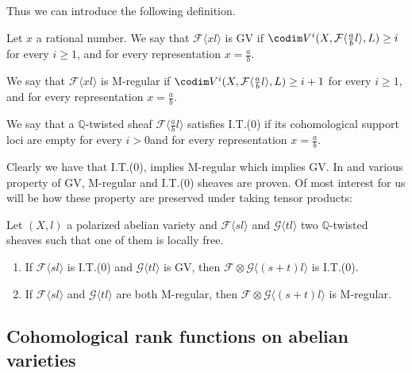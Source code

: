 \documentclass[11pt,letter]{amsart}
\numberwithin{equation}{section}
\begin{document}
 Thus we can introduce the following definition.
\begin{defi}\label{def2.1}
 Let $x$ a rational number. We say that $\mathcal{F}\langle xl\rangle$ is GV if $\codim V^i(X,\mathcal{F}\langle \frac{a}{b}l\rangle, L)\ge i$ for every $i\ge 1$, and for every representation $x=\frac{a}{b}$.\par
We say that $\mathcal{F}\langle xl\rangle$ is M-regular if $\codim V^i(X,\mathcal{F}\langle \frac{a}{b}l\rangle, L)\ge i+1$ for every $i\ge 1$, and for every representation $x=\frac{a}{b}$.\par
We say that a $\mathbb{Q}$-twisted sheaf $\mathcal{F}\langle \frac{a}{b}l\rangle$ satisfies I.T.(0) if its cohomological support loci are empty for every $i>0$and for every representation $x=\frac{a}{b}$. 
\end{defi}
Clearly we have that I.T.(0), implies M-regular which implies GV. In \cite{Caucci} and \cite{Ito22} various property of GV, M-regular and I.T.(0) sheaves are proven. Of most interest for us will be how these property are preserved under taking tensor products:
\begin{prop}\label{caucci}
Let $(X,l)$ a polarized abelian variety and  $\mathcal{F}\langle sl\rangle$ and $\mathcal{G}\langle tl\rangle$ two $\mathbb{Q}$-twisted sheaves such that one of them is locally free.
\begin{enumerate}
\item If $\mathcal{F}\langle sl\rangle$ is I.T.(0) and $\mathcal{G}\langle tl\rangle$ is GV, then $\mathcal{F}\otimes\mathcal{G}\langle(s+t)l\rangle$ is I.T.(0).
\item If $\mathcal{F}\langle sl\rangle$ and $\mathcal{G}\langle tl\rangle$ are both M-regular, then $\mathcal{F}\otimes\mathcal{G}\langle(s+t)l\rangle$ is M-regular.
\end{enumerate}
\end{prop}

\subsection{Cohomological rank functions on abelian varieties}\label{crf}
\end{document}

